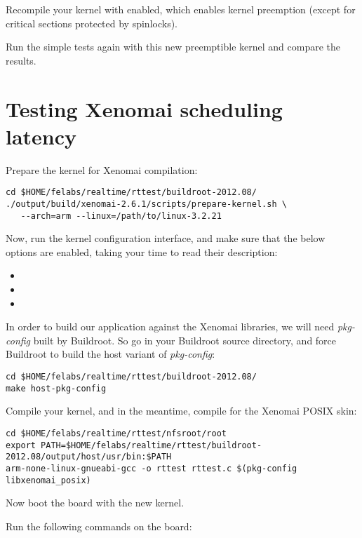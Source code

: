 Recompile your kernel with  enabled, which
enables kernel preemption (except for critical sections protected by
spinlocks).

Run the simple tests again with this new preemptible kernel and compare
the results.

\section{Testing Xenomai scheduling latency}

Prepare the kernel for Xenomai compilation:
\begin{verbatim}
cd $HOME/felabs/realtime/rttest/buildroot-2012.08/
./output/build/xenomai-2.6.1/scripts/prepare-kernel.sh \
   --arch=arm --linux=/path/to/linux-3.2.21
\end{verbatim}

Now, run the kernel configuration interface, and make sure that
the below options are enabled, taking your time to read their
description:

\begin{itemize}
\item {}
\item {}
\item {}
\end{itemize}

In order to build our application against the Xenomai libraries, we
will need {\em pkg-config} built by Buildroot. So go in your Buildroot
source directory, and force Buildroot to build the host variant of
{\em pkg-config}:

\begin{verbatim}
cd $HOME/felabs/realtime/rttest/buildroot-2012.08/
make host-pkg-config
\end{verbatim}

Compile your kernel, and in the meantime,
compile  for the Xenomai POSIX skin:

\small
\begin{verbatim}
cd $HOME/felabs/realtime/rttest/nfsroot/root
export PATH=$HOME/felabs/realtime/rttest/buildroot-2012.08/output/host/usr/bin:$PATH
arm-none-linux-gnueabi-gcc -o rttest rttest.c $(pkg-config libxenomai_posix)
\end{verbatim}
\normalsize

Now boot the board with the new kernel.

Run the following commands on the board:

